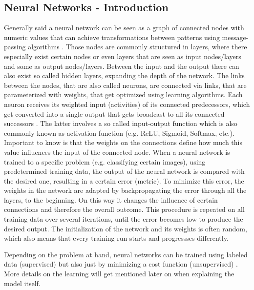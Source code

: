 \subsection{Neural Networks - Introduction}
Generally said a neural network can be seen as a graph of connected nodes  with numeric values that can achieve transformations between patterns using message-passing algorithms \cite{Jordan1996neuralnets}. Those nodes are commonly structured in layers, where there especially exist certain nodes or even layers that are seen as input nodes/layers and some as output nodes/layers. Between the input and the output there can also exist so called hidden layers, expanding the depth of the network. The links between the nodes, that are also called neurons, are connected via links, that are parameterized with weights, that get optimized using learning algorithms. Each neuron receives its weighted input (activities) of its connected predecessors, which get converted into a single output that gets broadcast to all its connected successors \cite{hinton1992neural}. The latter involves a so called input-output function which is also commonly known as activation function (e.g. ReLU, Sigmoid, Softmax, etc.). Important to know is that the weights on the connections define how much this value influences the input of the connected node. 
When a neural network is trained to a specific problem (e.g. classifying certain images), using predetermined training data, the output of the neural network is compared with the desired one, resulting in a certain error (metric). To minimize this error, the weights in the network are adapted by backpropagating the error through all the layers, to the beginning. On this way it changes the influence of certain connections and therefore the overall outcome. This procedure is repeated on all training data over several iterations, until the error becomes low to produce the desired output. The initialization of the network and its weights is often random, which also means that every training run starts and progressses differently.

Depending on the problem at hand, neural networks can be trained using labeled data (supervised) but also just by minimizing a cost function (unsupervised) \cite{oshea2015introductionConv}. More details on the learning will get mentioned later on when explaining the model itself. 

